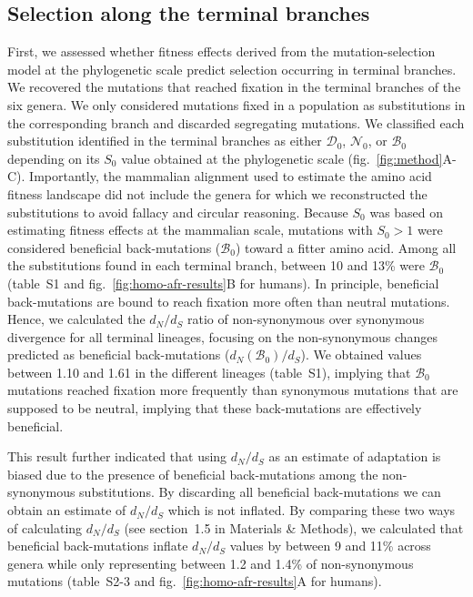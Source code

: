 \documentclass[12pt]{article}
\newcommand{\dn}{d_N}
\newcommand{\ds}{d_S}
\newcommand{\dnds}{\dn / \ds}
\newcommand{\Sphy}{S_{0}}
\newcommand{\SphyDel}{\mathcal{D}_0}
\newcommand{\SphyNeu}{\mathcal{N}_0}
\newcommand{\SphyBen}{\mathcal{B}_0}
\begin{document}
\subsection*{Selection along the terminal branches}
First, we assessed whether fitness effects derived from the mutation-selection model at the phylogenetic scale predict selection occurring in terminal branches.
We recovered the mutations that reached fixation in the terminal branches of the six genera.
We only considered mutations fixed in a population as substitutions in the corresponding branch and discarded segregating mutations.
We classified each substitution identified in the terminal branches as either $\SphyDel$, $\SphyNeu$, or $\SphyBen$ depending on its $\Sphy$ value obtained at the phylogenetic scale (fig.~\ref{fig:method}A-C).
Importantly, the mammalian alignment used to estimate the amino acid fitness landscape did not include the genera for which we reconstructed the substitutions to avoid fallacy and circular reasoning.
Because $\Sphy$ was based on estimating fitness effects at the mammalian scale, mutations with $\Sphy>1$ were considered beneficial back-mutations ($\SphyBen$) toward a fitter amino acid.
Among all the substitutions found in each terminal branch, between 10 and 13\% were $\SphyBen$ (table~S1 and fig.~\ref{fig:homo-afr-results}B for humans).
In principle, beneficial back-mutations are bound to reach fixation more often than neutral mutations.
Hence, we calculated the $\dnds$ ratio of non-synonymous over synonymous divergence for all terminal lineages, focusing on the non-synonymous changes predicted as beneficial back-mutations ($\dn(\SphyBen) / \ds$).
We obtained values between 1.10 and 1.61 in the different lineages (table~S1), implying that $\SphyBen$ mutations reached fixation more frequently than synonymous mutations that are supposed to be neutral, implying that these back-mutations are effectively beneficial.

This result further indicated that using $\dnds$ as an estimate of adaptation is biased due to the presence of beneficial back-mutations among the non-synonymous substitutions.
By discarding all beneficial back-mutations we can obtain an estimate of $\dnds$ which is not inflated.
By comparing these two ways of calculating $\dnds$ (see section~1.5 in Materials \& Methods), we calculated that beneficial back-mutations inflate $\dnds$ values by between 9 and 11\% across genera while only representing between 1.2 and 1.4\% of non-synonymous mutations (table~S2-3 and fig.~\ref{fig:homo-afr-results}A for humans).
\end{document}

